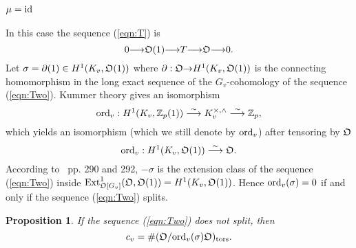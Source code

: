 \documentclass[12pt]{amsart}
\numberwithin{equation}{section}
\newtheorem{prop}[thm]{Proposition}
\begin{document}
 \subsubsection{$\mu=\textup{id}$}
 \label{subsec:mu=id}
 In this case the sequence (\ref{eqn:T}) is 
  \begin{equation}\label{eqn:Two} 0{\longrightarrow}\frak{O}(1) {\longrightarrow} T {\longrightarrow} \frak{O} {\longrightarrow} 0.\end{equation}
   Let $\sigma=\partial (1)\in H^1(K_v,\frak{O}(1))$ where $\partial: \frak{O} {\rightarrow} H^1(K_v,\frak{O}(1))$ is the connecting homomorphism in the long exact sequence of the $G_v$-cohomology of the sequence (\ref{eqn:Two}). Kummer theory gives an isomorphism
 $$\textup{ord}_v: H^1(K_v,{\mathbb{Z}}_p(1))\stackrel{\sim}{\longrightarrow} K_v^{\times,\wedge}\stackrel{\sim}{\longrightarrow} {\mathbb{Z}}_p, $$
  which yields an isomorphism (which we still denote by $\textup{ord}_v$) after tensoring by $\frak{O}$ 
  \begin{equation}\label{eqn:ord}\textup{ord}_v: H^1(K_v,\frak{O}(1))\stackrel{\sim}{\longrightarrow} \frak{O}.\end{equation}
 According to~\cite{cartaneilenberg} pp. 290 and 292, $-\sigma$ is the extension class
of the sequence (\ref{eqn:Two}) inside
$\textup{Ext}^1_{\frak{O}[G_v]}(\frak{O},\frak{O}(1))=H^1(K_v,\frak{O}(1))$. Hence
${\textup{ord}}_v(\sigma)=0$ if and only if the sequence (\ref{eqn:Two})
splits.
  \begin{prop}
 \label{prop:tamag}
If the sequence (\ref{eqn:Two}) does not split, then  
$$c_v= \# (\frak{O}/{\textup{ord}}_v(\sigma)\frak{O})_{\textup{tors}}.$$
 
 \end{prop}
\end{document}

